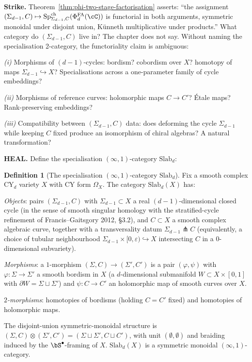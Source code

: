 \documentclass[11pt]{article}
\theoremstyle{definition}
\newtheorem{definition}[theorem]{Definition}
\providecommand{\PhiFA}{\Phi^{\mathrm{FA}}}
\providecommand{\SpCh}{\mathrm{Sp}^{\mathrm{ch}}}
\begin{document}
\noindent\textbf{Strike.} Theorem~\ref{thm:phi-two-stage-factorisation}
asserts: ``the assignment $(\Sigma_{d-1}, C) \mapsto
\SpCh_{\Sigma_{d-1}, C}(\PhiFA_d(\cC))$ is functorial in both
arguments, symmetric monoidal under disjoint union, K\"unneth
multiplicative under products.''  What category do $(\Sigma_{d-1}, C)$
live in? The chapter does not say. Without naming the
specialisation 2-category, the functoriality claim is ambiguous:

\smallskip
\emph{(i)} Morphisms of $(d-1)$-cycles: bordism? cobordism over $X$?
homotopy of maps $\Sigma_{d-1} \hookrightarrow X$? Specialisations
across a one-parameter family of cycle embeddings?

\emph{(ii)} Morphisms of reference curves: holomorphic maps
$C \to C'$? \'Etale maps? Rank-preserving embeddings?

\emph{(iii)} Compatibility between $(\Sigma_{d-1}, C)$ data: does
deforming the cycle $\Sigma_{d-1}$ while keeping $C$ fixed produce an
isomorphism of chiral algebras? A natural transformation?

\smallskip
\noindent\textbf{HEAL.} Define the specialisation
$(\infty, 1)$-category $\mathrm{Slab}_d$:

\begin{definition}[The specialisation $(\infty, 1)$-category $\mathrm{Slab}_d$]
\label{def:slab-d}
Fix a smooth complex CY$_d$ variety $X$ with CY form $\Omega_X$. The
category $\mathrm{Slab}_d(X)$ has:

\emph{Objects}: pairs $(\Sigma_{d-1}, C)$ with $\Sigma_{d-1} \subset X$
a real $(d-1)$-dimensional closed cycle (in the sense of smooth
singular homology with the stratified-cycle refinement of
Francis--Gaitsgory 2012, §3.2), and $C \subset X$ a smooth complex
algebraic curve, together with a transversality datum
$\Sigma_{d-1} \pitchfork C$ (equivalently, a choice of tubular
neighbourhood $\Sigma_{d-1} \times [0, \varepsilon) \hookrightarrow X$
intersecting $C$ in a $0$-dimensional subvariety).

\emph{Morphisms}: a $1$-morphism
$(\Sigma, C) \to (\Sigma', C')$ is a pair $(\varphi, \psi)$ with
$\varphi\colon \Sigma \to \Sigma'$ a smooth bordism in $X$ (a
$d$-dimensional submanifold $W \subset X \times [0, 1]$ with
$\partial W = \Sigma \sqcup \Sigma'$) and $\psi\colon C \to C'$ an
holomorphic map of smooth curves over $X$.

\emph{$2$-morphisms}: homotopies of bordisms (holding $C = C'$ fixed)
and homotopies of holomorphic maps.

The disjoint-union symmetric-monoidal structure is
$(\Sigma, C) \otimes (\Sigma', C') = (\Sigma \sqcup \Sigma', C \sqcup C')$,
with unit $(\emptyset, \emptyset)$ and braiding induced by the
$\bS^\bullet$-framing of $X$. $\mathrm{Slab}_d(X)$ is a symmetric
monoidal $(\infty, 1)$-category.
\end{definition}
\end{document}
